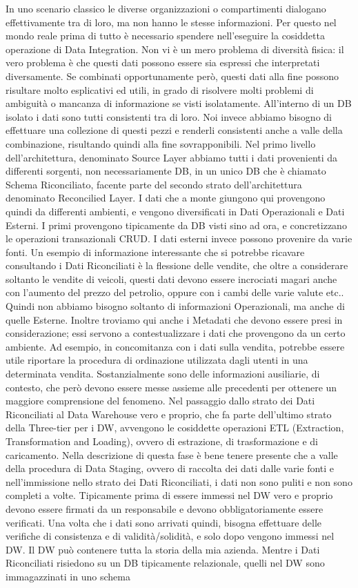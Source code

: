 In uno scenario classico le diverse organizzazioni o compartimenti dialogano effettivamente tra di loro, ma non hanno le stesse informazioni. Per questo nel mondo reale prima di tutto è necessario spendere nell'eseguire la cosiddetta operazione di Data Integration. Non vi è un mero problema di diversità fisica: il vero problema è che questi dati possono essere sia espressi che interpretati diversamente. Se combinati opportunamente però, questi dati alla fine possono risultare molto esplicativi ed utili, in grado di risolvere molti problemi di ambiguità o mancanza di informazione se visti isolatamente. All'interno di un DB isolato i dati sono tutti consistenti tra di loro. Noi invece abbiamo bisogno di effettuare una collezione di questi pezzi e renderli consistenti anche a valle della combinazione, risultando quindi alla fine sovrapponibili. Nel primo livello dell'architettura, denominato Source Layer abbiamo tutti i dati provenienti da differenti sorgenti, non necessariamente DB, in un unico DB che è chiamato Schema Riconciliato, facente parte del secondo strato dell'architettura denominato Reconcilied Layer. I dati che a monte giungono qui provengono quindi da differenti ambienti, e vengono diversificati in Dati Operazionali e Dati Esterni. I primi provengono tipicamente da DB visti sino ad ora, e concretizzano le operazioni transazionali CRUD. I dati esterni invece possono provenire da varie fonti. Un esempio di informazione interessante che si potrebbe ricavare consultando i Dati Riconciliati è la flessione delle vendite, che oltre a considerare soltanto le vendite di veicoli, questi dati devono essere incrociati magari anche con l'aumento del prezzo del petrolio, oppure con i cambi delle varie valute etc.. Quindi non abbiamo bisogno soltanto di informazioni Operazionali, ma anche di quelle Esterne. Inoltre troviamo qui anche i Metadati che devono essere presi in considerazione; essi servono a contestualizzare i dati che provengono da un certo ambiente. Ad esempio, in concomitanza con i dati sulla vendita, potrebbe essere utile riportare la procedura di ordinazione utilizzata dagli utenti in una determinata vendita. Sostanzialmente sono delle informazioni ausiliarie, di contesto, che però devono essere messe assieme alle precedenti per ottenere un maggiore comprensione del fenomeno. Nel passaggio dallo strato dei Dati Riconciliati al Data Warehouse vero e proprio, che fa parte dell'ultimo strato della Three-tier per i DW, avvengono le cosiddette operazioni ETL (Extraction, Transformation and Loading), ovvero di estrazione, di trasformazione e di caricamento. Nella descrizione di questa fase è bene tenere presente che a valle della procedura di Data Staging, ovvero di raccolta dei dati dalle varie fonti e nell'immissione nello strato dei Dati Riconciliati, i dati non sono puliti e non sono completi a volte. Tipicamente prima di essere immessi nel DW vero e proprio devono essere firmati da un responsabile e devono obbligatoriamente essere verificati. Una volta che i dati sono arrivati quindi, bisogna effettuare delle verifiche di consistenza e di validità/solidità, e solo dopo vengono immessi nel DW. Il DW può contenere tutta la storia della mia azienda. Mentre i Dati Riconciliati risiedono su un DB tipicamente relazionale, quelli nel DW sono immagazzinati in uno schema 